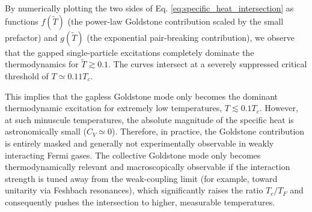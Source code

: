 By numerically plotting the two sides of Eq. \eqref{eq:specific_heat_intersection} as functions \( f(\tilde{T}) \) (the power-law Goldstone contribution scaled by the small prefactor) and \( g(\tilde{T}) \) (the exponential pair-breaking contribution), we observe that the gapped single-particle excitations completely dominate the thermodynamics for \( \tilde{T} \gtrsim 0.1 \). The curves intersect at a severely suppressed critical threshold of \( T \simeq 0.11 T_c \).

This implies that the gapless Goldstone mode only becomes the dominant thermodynamic excitation for extremely low temperatures, \( T \lesssim 0.1 T_c \). However, at such minuscule temperatures, the absolute magnitude of the specific heat is astronomically small (\( C_V \simeq 0 \)). Therefore, in practice, the Goldstone contribution is entirely masked and generally not experimentally observable in weakly interacting Fermi gases. The collective Goldstone mode only becomes thermodynamically relevant and macroscopically observable if the interaction strength is tuned away from the weak-coupling limit (for example, toward unitarity via Feshbach resonances), which significantly raises the ratio \( T_c/T_F \) and consequently pushes the intersection to higher, measurable temperatures.
